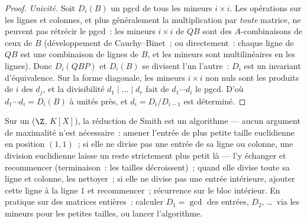 \begin{proof}
\emph{Unicité.} Soit $D_i(B)$ un pgcd de tous les mineurs $i
\times i$. Les opérations sur les lignes et colonnes, et plus
généralement la multiplication par \emph{toute} matrice, ne
peuvent pas rétrécir le pgcd~: les mineurs $i \times i$ de $QB$
sont des $A$-combinaisons de ceux de $B$ (développement de
Cauchy--Binet~; ou directement~: chaque ligne de $QB$ est une
combinaison de lignes de $B$, et les mineurs sont multilinéaires
en les lignes). Donc $D_i(QBP)$ et $D_i(B)$ se divisent l'un
l'autre~: $D_i$ est un invariant d'équivalence. Sur la forme
diagonale, les mineurs $i \times i$ non nuls sont les produits
de $i$ des $d_j$, et la divisibilité $d_1 \mid \dots \mid d_r$
fait de $d_1 \cdots d_i$ le pgcd. D'où $d_1 \cdots d_i =
D_i(B)$ à unités près, et $d_i = D_i/D_{i-1}$ est déterminé.
\end{proof}

\begin{method}\label{met:b3:modules:smith}
Sur un  ($\Z$, $K[X]$), la réduction de Smith
est un algorithme --- aucun argument de maximalité n'est
nécessaire~: amener l'entrée de plus petite taille euclidienne
en position $(1,1)$~; si elle ne divise pas une entrée de sa
ligne ou colonne, une division euclidienne laisse un reste
strictement plus petit là --- l'y échanger et recommencer
(terminaison~: les tailles décroissent)~; quand elle divise toute
sa ligne et colonne, les nettoyer~; si elle ne divise pas une
entrée intérieure, ajouter cette ligne à la ligne $1$ et
recommencer~; récurrence sur le bloc intérieur. En pratique sur
des matrices entières~: calculer $D_1 = \gcd$ des entrées,
$D_2$, \dots\ via les mineurs pour les petites tailles, ou
lancer l'algorithme.
\end{method}

